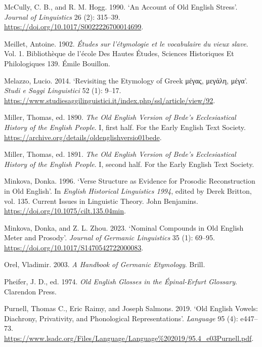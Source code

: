 \documentclass[
  british,
  a4paper,
]{article}
\newlength{\cslhangindent}
\newenvironment{CSLReferences}[2] %
 {\begin{list}{}{%
  \setlength{\itemindent}{0pt}
  \setlength{\leftmargin}{0pt}
  \setlength{\parsep}{0pt}
  \ifodd #1
   \setlength{\leftmargin}{\cslhangindent}
   \setlength{\itemindent}{-1\cslhangindent}
  \fi
  \setlength{\itemsep}{#2\baselineskip}}}
 {\end{list}}
\begin{document}
\begin{CSLReferences}{1}{1}
McCully, C. B., and R. M. Hogg. 1990. {`An Account of {Old English}
Stress'}. \emph{Journal of Linguistics} 26 (2): 315--39.
\url{https://doi.org/10.1017/S0022226700014699}.

Meillet, Antoine. 1902. \emph{{Études sur l'étymologie et le vocabulaire
du vieux slave}}. Vol. 1. Bibliothèque de l'école Des Hautes Études,
Sciences Historiques Et Philologiques 139. Émile Bouillon.

Melazzo, Lucio. 2014. {`{Revisiting the Etymology of Greek μέγας,
μεγάλη, μέγα}'}. \emph{Studi e Saggi Linguistici} 52 (1): 9--17.
\url{https://www.studiesaggilinguistici.it/index.php/ssl/article/view/92}.

Miller, Thomas, ed. 1890. \emph{The {Old English} Version of {Bede}'s
Ecclesiastical History of the English People}. I, first half. For the
Early English Text Society.
\url{https://archive.org/details/oldenglishversio01bede}.

Miller, Thomas, ed. 1891. \emph{The {Old English} Version of {Bede}'s
Ecclesiastical History of the English People}. I, second half. For the
Early English Text Society.

Minkova, Donka. 1996. {`Verse Structure as Evidence for Prosodic
Reconstruction in {Old English}'}. In \emph{{English Historical
Linguistics 1994}}, edited by Derek Britton, vol. 135. Current Issues in
Linguistic Theory. John Benjamins.
\url{https://doi.org/10.1075/cilt.135.04min}.

Minkova, Donka, and Z. L. Zhou. 2023. {`Nominal Compounds in {Old
English} Meter and Prosody'}. \emph{Journal of Germanic Linguistics} 35
(1): 69--95. \url{https://doi.org/10.1017/S1470542722000083}.

Orel, Vladimir. 2003. \emph{A Handbook of {Germanic} Etymology}. Brill.

Pheifer, J. D., ed. 1974. \emph{Old {English} Glosses in the
{É}pinal-{Erfurt} Glossary}. Clarendon Press.

Purnell, Thomas C., Eric Raimy, and Joseph Salmons. 2019. {`{Old
English} Vowels: Diachrony, Privativity, and Phonological
Representations'}. \emph{Language} 95 (4): e447--73.
\url{https://www.lsadc.org/Files/Language/Language\%202019/95.4_e03Purnell.pdf}.


\end{CSLReferences}
\end{document}
